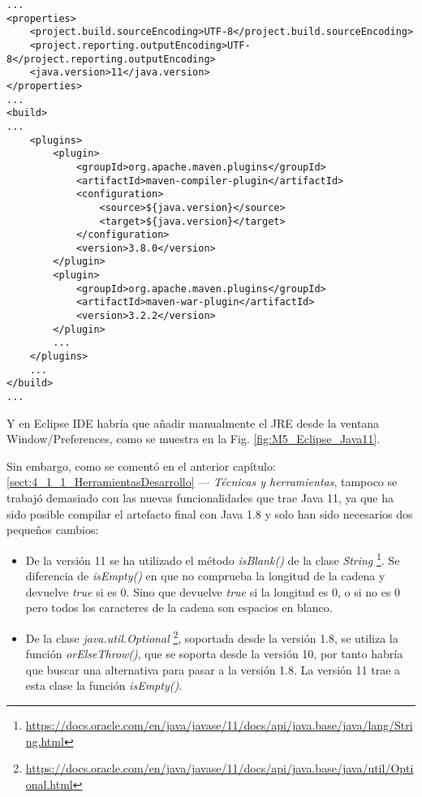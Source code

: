 \begin{minipage}{\linewidth}
{\tiny
\begin{lstlisting}[breaklines]
...
<properties>
	<project.build.sourceEncoding>UTF-8</project.build.sourceEncoding>
	<project.reporting.outputEncoding>UTF-8</project.reporting.outputEncoding>
	<java.version>11</java.version>
</properties>
...
<build>
...
	<plugins>
		<plugin>
			<groupId>org.apache.maven.plugins</groupId>
			<artifactId>maven-compiler-plugin</artifactId>
			<configuration>
				<source>${java.version}</source>
				<target>${java.version}</target>
			</configuration>
			<version>3.8.0</version>
		</plugin>
		<plugin>
			<groupId>org.apache.maven.plugins</groupId>
			<artifactId>maven-war-plugin</artifactId>
			<version>3.2.2</version>
		</plugin>
		...
	</plugins>
	...
</build>
...
\end{lstlisting}
}
\end{minipage}

Y en Eclipse IDE habría que añadir manualmente el JRE desde la ventana Window/Preferences, como se muestra en la Fig. \ref{fig:M5_Eclipse_Java11}.


Sin embargo, como se comentó en el anterior capítulo: \ref{sect:4_1_1_HerramientasDesarrollo} --- \textit{Técnicas y herramientas}, tampoco se trabajó demasiado con las nuevas funcionalidades que trae Java 11, ya que ha sido posible compilar el artefacto final con Java 1.8 y solo han sido necesarios dos pequeños cambios:
\begin{itemize}
	\item De la versión 11 se ha utilizado el método \textit{isBlank()} de la clase \textit{String} \footnote{\url{https://docs.oracle.com/en/java/javase/11/docs/api/java.base/java/lang/String.html}}. Se diferencia de \textit{isEmpty()} en que no comprueba la longitud de la cadena y devuelve \textit{true} si es 0. Sino que devuelve \textit{true} si la longitud es 0, o si no es 0 pero todos los caracteres de la cadena son espacios en blanco.
	\item De la clase \textit{java.util.Optional} \footnote{\url{https://docs.oracle.com/en/java/javase/11/docs/api/java.base/java/util/Optional.html}}, soportada desde la versión 1.8, se utiliza la función \textit{orElseThrow()}, que se soporta desde la versión 10, por tanto habría que buscar una alternativa para pasar a la versión 1.8. La versión 11 trae a esta clase la función \textit{isEmpty()}.
\end{itemize}

